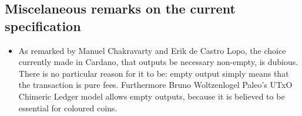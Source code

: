 \documentclass{article}
\begin{document}
\subsection{Miscelaneous remarks on the current specification}
\label{sec:misc-remarks}
\begin{itemize}
\item As remarked by Manuel Chakravarty and Erik de Castro Lopo, the
  choice currently made in Cardano, that outputs be necessary
  non-empty, is dubious. There is no particular reason for it to be:
  empty output simply means that the transaction is pure
  fees. Furthermore Bruno Woltzenlogel Paleo's UTxO Chimeric Ledger
  model allows empty outputs, because it is believed to be essential
  for coloured coins.
\end{itemize}
\end{document}
